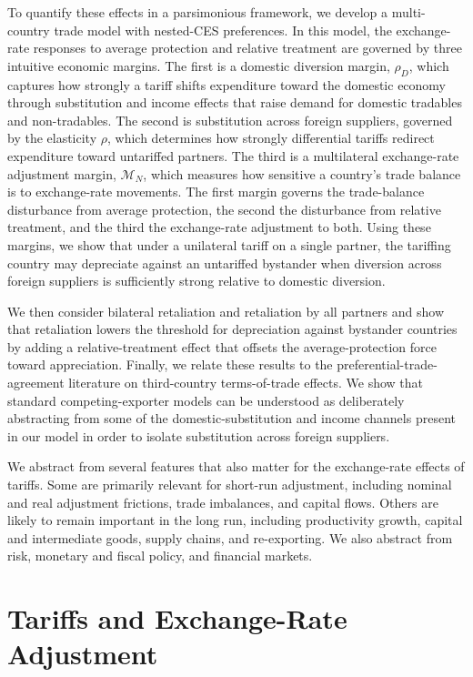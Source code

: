 \documentclass[11pt]{article}
\begin{document}
To quantify these effects in a parsimonious framework, we develop a multi-country trade model with nested-CES preferences. In this model, the exchange-rate responses to average protection and relative treatment are governed by three intuitive economic margins. The first is a domestic diversion margin, $\rho_D$, which captures how strongly a tariff shifts expenditure toward the domestic economy through substitution and income effects that raise demand for domestic tradables and non-tradables. The second is substitution across foreign suppliers, governed by the elasticity $\rho$, which determines how strongly differential tariffs redirect expenditure toward untariffed partners. The third is a multilateral exchange-rate adjustment margin, $\mathcal M_N$, which measures how sensitive a country's trade balance is to exchange-rate movements. The first margin governs the trade-balance disturbance from average protection, the second the disturbance from relative treatment, and the third the exchange-rate adjustment to both. Using these margins, we show that under a unilateral tariff on a single partner, the tariffing country may depreciate against an untariffed bystander when diversion across foreign suppliers is sufficiently strong relative to domestic diversion.

We then consider bilateral retaliation and retaliation by all partners and show that retaliation lowers the threshold for depreciation against bystander countries by adding a relative-treatment effect that offsets the average-protection force toward appreciation. Finally, we relate these results to the preferential-trade-agreement literature on third-country terms-of-trade effects. We show that standard competing-exporter models can be understood as deliberately abstracting from some of the domestic-substitution and income channels present in our model in order to isolate substitution across foreign suppliers.

We abstract from several features that also matter for the exchange-rate effects of tariffs. Some are primarily relevant for short-run adjustment, including nominal and real adjustment frictions, trade imbalances, and capital flows. Others are likely to remain important in the long run, including productivity growth, capital and intermediate goods, supply chains, and re-exporting. We also abstract from risk, monetary and fiscal policy, and financial markets.

\section{Tariffs and Exchange-Rate Adjustment}
\label{sec:general}
\end{document}
